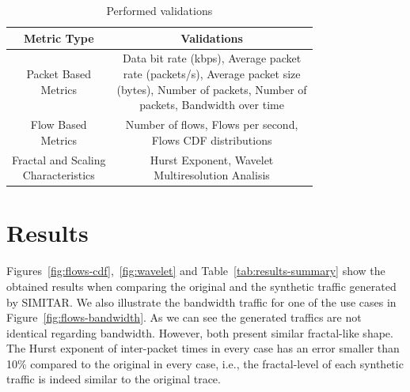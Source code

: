 \begin{table}[!htb]
	\centering
	\caption{Performed validations}
		\begin{tabular}{c c}
			\toprule
			\textbf{Metric Type} & \textbf{Validations} \\
			\midrule
			\makecell{Packet Based \\Metrics}                & \makecell{Data bit rate (kbps), Average packet\\
				rate (packets/s), Average packet size\\
				(bytes), Number of packets, Number of\\
				packets, Bandwidth over time}\\
			
			\makecell{Flow Based \\ Metrics}                & \makecell{Number of flows, Flows per second, \\
				Flows CDF distributions}\\
			
			\makecell{Fractal and Scaling \\ Characteristics} & \makecell{Hurst Exponent, Wavelet \\
				Multiresolution Analisis}\\
			\bottomrule
		\end{tabular}
	\label{tab:validation-tests-performed}
\end{table}


\section{Results}


Figures~\ref{fig:flows-cdf},~\ref{fig:wavelet} and Table~\ref{tab:results-summary} show the obtained results when comparing the original and the synthetic traffic generated by SIMITAR. We also illustrate the bandwidth traffic for one of the use cases in Figure~\ref{fig:flows-bandwidth}. As we can see the generated traffics are not identical regarding bandwidth. However, both present similar fractal-like shape. The Hurst exponent of inter-packet times in every case has an error smaller than 10\% compared to the original in every case, i.e., the fractal-level of each synthetic traffic is indeed similar to the original trace.

